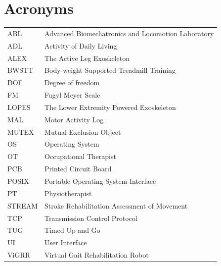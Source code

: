 \documentclass[12pt]{report}
\begin{document}
\tableofcontents
\listoffigures
\listoftables

\chapter*{Acronyms} 

\begin{tabular}{l l}
ABL \hspace{5mm} &Advanced Biomechatronics and Locomotion Laboratory \\
ADL \hspace{5mm} &Activity of Daily Living \\
ALEX \hspace{5mm} &The Active Leg Exoskeleton \\
BWSTT \hspace{5mm} &Body-weight Supported Treadmill Training \\
DOF \hspace{5mm} &Degree of freedom \\
FM \hspace{5mm} &Fugyl Meyer Scale \\
LOPES \hspace{5mm} &The Lower Extremity Powered Exoskeleton \\
MAL \hspace{5mm} &Motor Activity Log \\
MUTEX \hspace{5mm} &Mutual Exclusion Object \\
OS \hspace{5mm} &Operating System \\
OT \hspace{5mm} &Occupational Therapist \\
PCB \hspace{5mm} &Printed Circuit Board \\
POSIX \hspace{5mm} &Portable Operating System Interface \\
PT \hspace{5mm} &Physiotherapist \\
STREAM \hspace{5mm} &Stroke Rehabilitation Assessment of Movement \\
TCP \hspace{5mm} &Transmission Control Protocol \\
TUG \hspace{5mm} &Timed Up and Go \\
UI \hspace{5mm} &User Interface \\
ViGRR \hspace{5mm} &Virtual Gait Rehabilitation Robot \\
\end{tabular}
\end{document}
